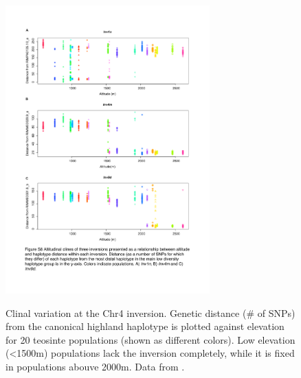 \begin{figure}
  \centering
  \caption{Clinal variation at the Chr4 inversion. Genetic distance (\# of SNPs) from the canonical highland haplotype is plotted against elevation for 20 teosinte populations (shown as different colors).  Low elevation (<1500m) populations lack the inversion completely, while it is fixed in populations abouve 2000m. Data from \citet{Pyhajarvi2013}. } 
   \includegraphics[width=0.7\textwidth]{chr4.pdf}
\label{fig:cline}
\end{figure}

